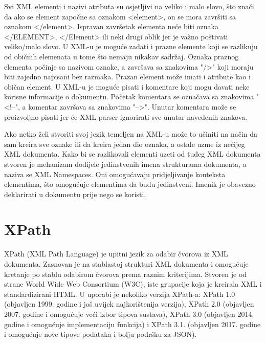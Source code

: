 \documentclass{foi}
\begin{document}
Svi XML elementi i nazivi atributa su osjetljivi na veliko i malo slovo, što znači da ako se element započne sa oznakom <element>, on se mora završiti sa oznakom </element>. Ispravan završetak elementa neće biti oznaka </ELEMENT>, </Element> ili neki drugi oblik jer je važno poštivati veliko/malo slovo. U XML-u je moguće zadati i prazne elemente koji se razlikuju od običnih elemenata u tome što nemaju nikakav sadržaj. Oznaka praznog elementa počinje sa nazivom oznake, a završava sa znakovima "/>" koji moraju biti zajedno napisani bez razmaka. Prazan element može imati i atribute kao i običan element. U XML-u je moguće pisati i komentare koji mogu davati neke korisne informacije o dokumentu. Početak komentara se označava sa znakovima "<!--", a komentar završava sa znakovima "-->". Unutar komentara može se proizvoljno pisati jer će XML parser ignorirati sve unutar navedenih znakova. \cite{xmlSoapProgramming}

Ako netko želi stvoriti svoj jezik temeljen na XML-u može to učiniti na način da sam kreira sve oznake ili da kreira jedan dio oznaka, a ostale uzme iz nečijeg XML dokumenta. Kako bi se razlikovali elementi uzeti od tuđeg XML dokumenta stvoren je mehanizam dodijele jedinstvenih imena strukturama dokumenta, a naziva se XML Namespaces. Oni omogućavaju pridjeljivanje konteksta elementima, što omogućuje elementima da budu jedinstveni. Imenik je obavezno deklarirati u dokumentu prije nego se koristi.

\section{XPath}

XPath (XML Path Language) je upitni jezik za odabir čvorova iz XML dokumenta. Zasnovan je na stablastoj strukturi XML dokumenta i omogućuje kretanje po stablu odabirom čvorova prema raznim kriterijima. Stvoren je od strane World Wide Web Consortium (W3C), iste grupacije koja je kreirala XML i standardizirani HTML. U uporabi je nekoliko verzija XPath-a: XPath 1.0 (objavljen 1999. godine i još uvijek najkorištenija verzija), XPath 2.0 (objavljen 2007. godine  i omogućuje veći izbor tipova sustava), XPath 3.0 (objavljen 2014. godine i omogućuje implementaciju funkcija) i XPath 3.1. (objavljen 2017. godine i omogućuje nove tipove podataka i bolju podršku za JSON).
\end{document}
